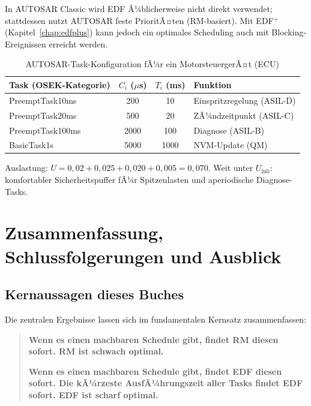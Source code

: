 ﻿\documentclass[a4paper,12pt]{report}
\theoremstyle{definition}
\begin{document}
In AUTOSAR Classic wird EDF Ã¼blicherweise nicht direkt verwendet; stattdessen
nutzt AUTOSAR feste PrioritÃ¤ten (RM-basiert). Mit EDF$^+$ (Kapitel~\ref{chap:edfplus})
kann jedoch ein optimales Scheduling auch mit Blocking-Ereignissen erreicht werden.

\begin{table}[H]
	\centering
	\caption{AUTOSAR-Task-Konfiguration fÃ¼r ein MotorsteuergerÃ¤t (ECU)}
	\begin{tabular}{lccl}
		\toprule
		\textbf{Task (OSEK-Kategorie)} & $C_i$ ($\mu$s) & $T_i$ (ms) & \textbf{Funktion} \\
		\midrule
		PreemptTask10ms & 200  & 10   & Einspritzregelung (ASIL-D) \\
		PreemptTask20ms & 500  & 20   & ZÃ¼ndzeitpunkt (ASIL-C) \\
		PreemptTask100ms & 2000 & 100  & Diagnose (ASIL-B) \\
		BasicTask1s     & 5000 & 1000 & NVM-Update (QM) \\
		\bottomrule
	\end{tabular}
\end{table}

Auslastung: $U = 0{,}02 + 0{,}025 + 0{,}020 + 0{,}005 = 0{,}070$. Weit unter $U_{\text{lub}}$:
komfortabler Sicherheitspuffer fÃ¼r Spitzenlasten und aperiodische Diagnose-Tasks.

\chapter{Zusammenfassung, Schlussfolgerungen und Ausblick}
\label{chap:zusammenfassung}

\section{Kernaussagen dieses Buches}

Die zentralen Ergebnisse lassen sich im fundamentalen Kernsatz zusammenfassen:

\begin{quote}
\textbf{Wenn es einen machbaren Schedule gibt, findet RM diesen sofort. RM ist schwach optimal.}

\textbf{Wenn es einen machbaren Schedule gibt, findet EDF diesen sofort.
Die kÃ¼rzeste AusfÃ¼hrungszeit aller Tasks findet EDF sofort. EDF ist scharf optimal.}
\end{quote}
\end{document}
